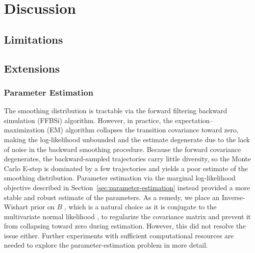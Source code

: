 \chapter{Discussion}

\section{Limitations}

\section{Extensions}
\subsection{Parameter Estimation}

The smoothing distribution is tractable via the forward filtering backward simulation (FFBSi) algorithm. However, in practice, the expectation--maximization (EM) algorithm \citep{nealhinton1998emview,chopinpapaspiliopoulos020introtosmc} collapses the transition covariance toward zero, making the log-likelihood unbounded and the estimate degenerate due to the lack of noise in the backward smoothing procedure. Because the forward covariance degenerates, the backward-sampled trajectories carry little diversity, so the Monte Carlo E-step is dominated by a few trajectories and yields a poor estimate of the smoothing distribution. Parameter estimation via the marginal log-likelihood objective described in Section~\ref{sec:parameter-estimation} instead provided a more stable and robust estimate of the parameters. As a remedy, we place an Inverse-Wishart prior on $B$ \citep{barnard2000modeling,gelman2014bayesian}, which is a natural choice as it is conjugate to the multivariate normal likelihood \citep{leonard1992bayesian}, to regularize the covariance matrix and prevent it from collapsing toward zero during estimation. However, this did not resolve the issue either. Further experiments with sufficient computational resources are needed to explore the parameter-estimation problem in more detail.